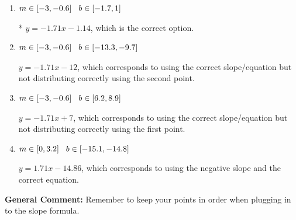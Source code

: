\documentclass{extbook}[14pt]
\begin{document}
\begin{enumerate}
{\begin{enumerate}[label=\Alph*.]
 $y = -1.71x + 1.14$, which corresponds to using the correct slope and getting the negative y-intercept.
\item \( m \in [-3, -0.6] \hspace*{3mm} b \in [-1.7, 1] \)

* $y = -1.71x -1.14$, which is the correct option.
\item \( m \in [-3, -0.6] \hspace*{3mm} b \in [-13.3, -9.7] \)

 $y = -1.71x -12$, which corresponds to using the correct slope/equation but not distributing correctly using the second point.
\item \( m \in [-3, -0.6] \hspace*{3mm} b \in [6.2, 8.9] \)

 $y = -1.71x + 7$, which corresponds to using the correct slope/equation but not distributing correctly using the first point.
\item \( m \in [0, 3.2] \hspace*{3mm} b \in [-15.1, -14.8] \)

 $y = 1.71x -14.86$, which corresponds to using the negative slope and the correct equation.
\end{enumerate}

\textbf{General Comment:} Remember to keep your points in order when plugging in to the slope formula.
}
\end{enumerate}
\end{document}
